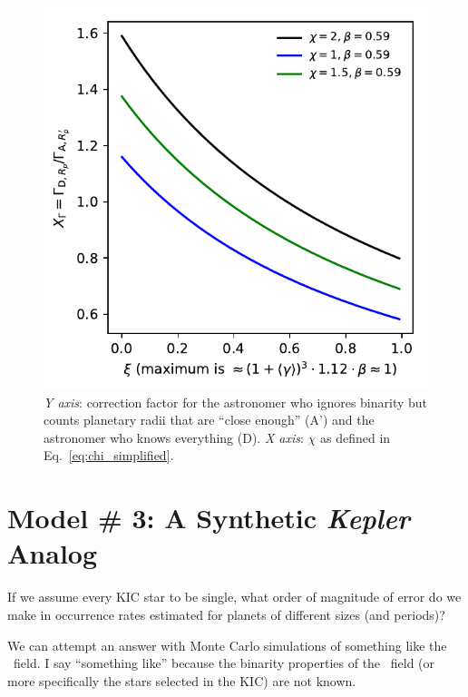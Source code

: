 \documentclass{emulateapj}
\begin{document}
\begin{figure}[!t]
	\begin{center}
		\includegraphics[scale=.8]{figures/XGamma_vs_xi.pdf}
	\end{center}
	\caption{\textit{Y axis}: correction factor for the astronomer who 
	ignores binarity but counts planetary radii that are ``close enough'' (A') 
	and the astronomer who knows everything (D).
	\textit{X axis}: $\chi$ as defined in Eq.~\ref{eq:chi_simplified}.
	}
	\label{fig:XGamma_vs_xi}
\end{figure}



\section{Model \# 3: A Synthetic {\it Kepler} Analog}
\label{sec:model_3}

If we assume every KIC star to be single, what order of magnitude of error do 
we make in occurrence rates estimated for planets of different sizes (and 
periods)?

We can attempt an answer with Monte Carlo simulations of something like the 
\kepler\ field. I say ``something like'' because the binarity properties of the 
\kepler\ field (or more specifically the stars selected in the KIC) are not 
known.
\end{document}
